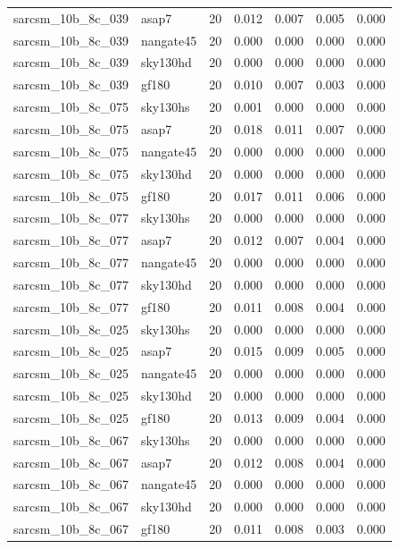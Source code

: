 \begin{tabular}{llrrrrr}
sarcsm\_10b\_8c\_039 & asap7 & 20 & 0.012 & 0.007 & 0.005 & 0.000 \\
sarcsm\_10b\_8c\_039 & nangate45 & 20 & 0.000 & 0.000 & 0.000 & 0.000 \\
sarcsm\_10b\_8c\_039 & sky130hd & 20 & 0.000 & 0.000 & 0.000 & 0.000 \\
sarcsm\_10b\_8c\_039 & gf180 & 20 & 0.010 & 0.007 & 0.003 & 0.000 \\
sarcsm\_10b\_8c\_075 & sky130hs & 20 & 0.001 & 0.000 & 0.000 & 0.000 \\
sarcsm\_10b\_8c\_075 & asap7 & 20 & 0.018 & 0.011 & 0.007 & 0.000 \\
sarcsm\_10b\_8c\_075 & nangate45 & 20 & 0.000 & 0.000 & 0.000 & 0.000 \\
sarcsm\_10b\_8c\_075 & sky130hd & 20 & 0.000 & 0.000 & 0.000 & 0.000 \\
sarcsm\_10b\_8c\_075 & gf180 & 20 & 0.017 & 0.011 & 0.006 & 0.000 \\
sarcsm\_10b\_8c\_077 & sky130hs & 20 & 0.000 & 0.000 & 0.000 & 0.000 \\
sarcsm\_10b\_8c\_077 & asap7 & 20 & 0.012 & 0.007 & 0.004 & 0.000 \\
sarcsm\_10b\_8c\_077 & nangate45 & 20 & 0.000 & 0.000 & 0.000 & 0.000 \\
sarcsm\_10b\_8c\_077 & sky130hd & 20 & 0.000 & 0.000 & 0.000 & 0.000 \\
sarcsm\_10b\_8c\_077 & gf180 & 20 & 0.011 & 0.008 & 0.004 & 0.000 \\
sarcsm\_10b\_8c\_025 & sky130hs & 20 & 0.000 & 0.000 & 0.000 & 0.000 \\
sarcsm\_10b\_8c\_025 & asap7 & 20 & 0.015 & 0.009 & 0.005 & 0.000 \\
sarcsm\_10b\_8c\_025 & nangate45 & 20 & 0.000 & 0.000 & 0.000 & 0.000 \\
sarcsm\_10b\_8c\_025 & sky130hd & 20 & 0.000 & 0.000 & 0.000 & 0.000 \\
sarcsm\_10b\_8c\_025 & gf180 & 20 & 0.013 & 0.009 & 0.004 & 0.000 \\
sarcsm\_10b\_8c\_067 & sky130hs & 20 & 0.000 & 0.000 & 0.000 & 0.000 \\
sarcsm\_10b\_8c\_067 & asap7 & 20 & 0.012 & 0.008 & 0.004 & 0.000 \\
sarcsm\_10b\_8c\_067 & nangate45 & 20 & 0.000 & 0.000 & 0.000 & 0.000 \\
sarcsm\_10b\_8c\_067 & sky130hd & 20 & 0.000 & 0.000 & 0.000 & 0.000 \\
sarcsm\_10b\_8c\_067 & gf180 & 20 & 0.011 & 0.008 & 0.003 & 0.000 \\

\end{tabular}
